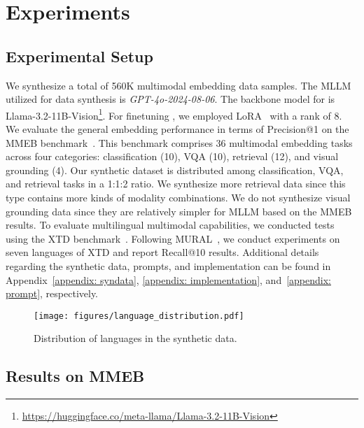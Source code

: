 

\section{Experiments}


\subsection{Experimental Setup}
\label{subsec:setup}


We synthesize a total of 560K multimodal embedding data samples.
The MLLM utilized for data synthesis is \textit{GPT-4o-2024-08-06}.
The backbone model for \ours{} is Llama-3.2-11B-Vision\footnote{\url{https://huggingface.co/meta-llama/Llama-3.2-11B-Vision}}.
For finetuning \ours{}, we employed LoRA~\cite{lora} with a rank of 8.
We evaluate the general embedding performance in terms of Precision@1 on the MMEB benchmark~\cite{MMEB}.
This benchmark comprises 36 multimodal embedding tasks across four categories: classification (10), VQA (10), retrieval (12), and visual grounding (4).
Our synthetic dataset is distributed among classification, VQA, and retrieval tasks in a 1:1:2 ratio.
We synthesize more retrieval data since this type contains more kinds of modality combinations.
We do not synthesize visual grounding data since they are relatively simpler for MLLM based on the MMEB results.
To evaluate multilingual multimodal capabilities, we conducted tests using the XTD benchmark~\cite{XTD}.
Following MURAL~\cite{mural}, we conduct experiments on seven languages of XTD and report Recall@10 results.
Additional details regarding the synthetic data, prompts, and implementation can be found in Appendix~\ref{appendix: syndata}, \ref{appendix: implementation}, and~\ref{appendix: prompt}, respectively.



\begin{figure}[!tbp]
\centering
\texttt{[image: figures/language\_distribution.pdf]}
\vspace{-2pt}
\caption{Distribution of languages in the synthetic data.}
\label{fig:language_dist} 
\end{figure}

\subsection{Results on MMEB}

